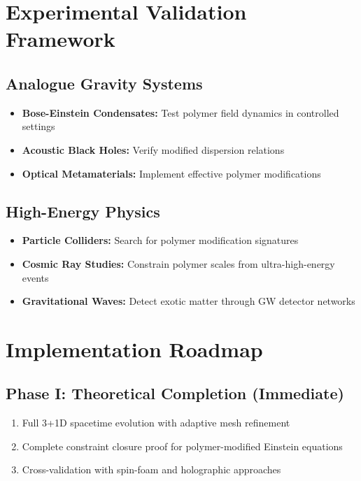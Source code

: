 \documentclass[11pt]{article}
\begin{document}
\section{Experimental Validation Framework}

\subsection{Analogue Gravity Systems}
\begin{itemize}
  \item \textbf{Bose-Einstein Condensates:} Test polymer field dynamics in controlled settings
  \item \textbf{Acoustic Black Holes:} Verify modified dispersion relations
  \item \textbf{Optical Metamaterials:} Implement effective polymer modifications
\end{itemize}

\subsection{High-Energy Physics}
\begin{itemize}
  \item \textbf{Particle Colliders:} Search for polymer modification signatures
  \item \textbf{Cosmic Ray Studies:} Constrain polymer scales from ultra-high-energy events
  \item \textbf{Gravitational Waves:} Detect exotic matter through GW detector networks
\end{itemize}

\section{Implementation Roadmap}

\subsection{Phase I: Theoretical Completion (Immediate)}
\begin{enumerate}
  \item Full 3+1D spacetime evolution with adaptive mesh refinement
  \item Complete constraint closure proof for polymer-modified Einstein equations
  \item Cross-validation with spin-foam and holographic approaches
\end{enumerate}
\end{document}
